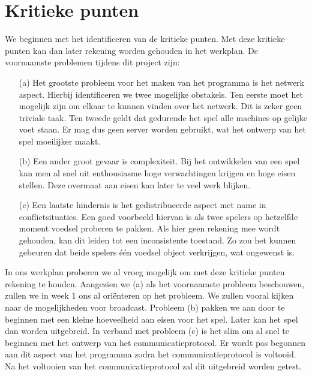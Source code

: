\documentclass[a4paper,11pt]{article}
\begin{document}
	
	
	\tableofcontents
	\newpage

	\section{Kritieke punten}
    We beginnen met het identificeren van de kritieke punten. Met deze kritieke punten kan dan later rekening worden gehouden in het werkplan. De voornaamste problemen tijdens dit project zijn:
    \begin{enumerate}
    \item[(a)] Het grootste probleem voor het maken van het programma is het netwerk aspect. Hierbij identificeren we twee mogelijke obstakels. Ten eerste moet het mogelijk zijn om elkaar te kunnen vinden over het netwerk. Dit is zeker geen triviale taak. Ten tweede geldt dat gedurende het spel alle machines op gelijke voet staan. Er mag dus geen server worden gebruikt, wat het ontwerp van het spel moeilijker maakt.
    \item[(b)] Een ander groot gevaar is complexiteit. Bij het ontwikkelen van een spel kan men al snel uit enthousiasme hoge verwachtingen krijgen en hoge eisen stellen. Deze overmaat aan eisen kan later te veel werk blijken.
    \item[(c)] Een laatste hindernis is het gedistribueerde aspect met name in conflictsituaties. Een goed voorbeeld hiervan is als twee spelers op hetzelfde moment voedsel proberen te pakken. Als hier geen rekening mee wordt gehouden, kan dit leiden tot een inconsistente toestand. Zo zou het kunnen gebeuren dat beide spelers \'e\'en voedsel object verkrijgen, wat ongewenst is.
    \end{enumerate}

    In ons werkplan proberen we al vroeg mogelijk om met deze kritieke punten rekening te houden. Aangezien we (a) als het voornaamste probleem beschouwen, zullen we in week 1 ons al ori\"enteren op het probleem. We zullen vooral kijken naar de mogelijkheden voor broadcast. Probleem (b) pakken we aan door te beginnen met een kleine hoeveelheid aan eisen voor het spel. Later kan het spel dan worden uitgebreid. In verband met probleem (c) is het slim om al snel te beginnen met het ontwerp van het communicatieprotocol. Er wordt pas begonnen aan dit aspect van het programma zodra het communicatieprotocol is voltooid. Na het voltooien van het communicatieprotocol zal dit uitgebreid worden getest.
\end{document}

